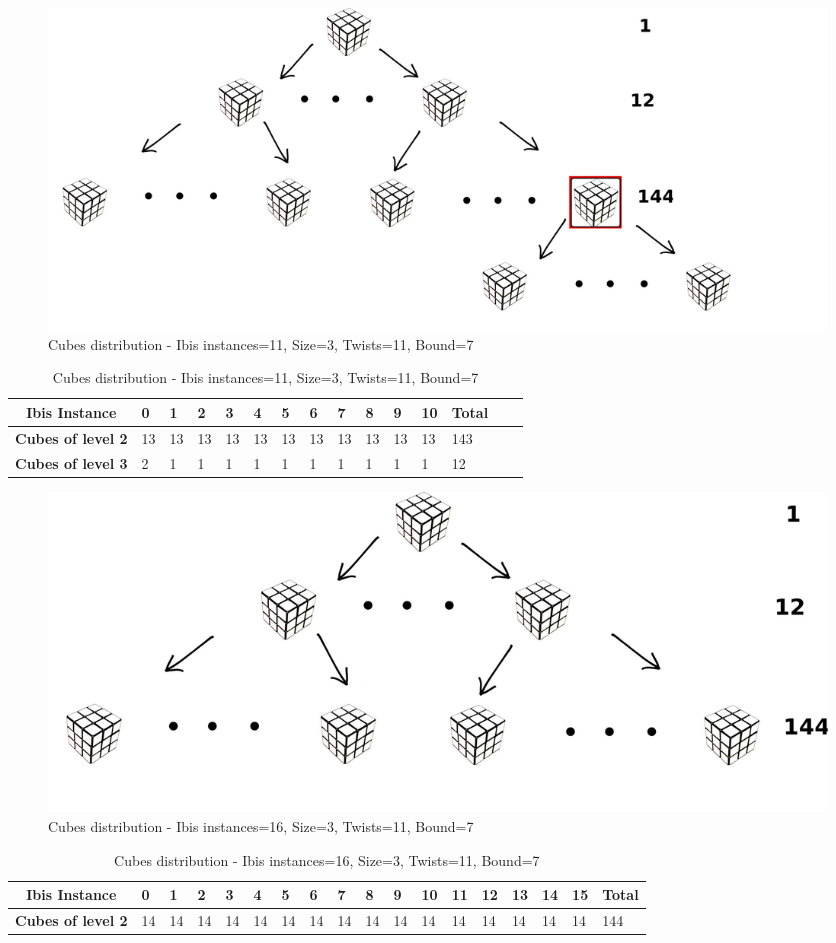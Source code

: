 \documentclass[a4paper]{article}
\begin{document}
\begin{figure}[!ht]
  \centering
  \includegraphics[width=0.7\linewidth]{rubik_tree_eval3}
  \caption{Cubes distribution - Ibis instances=11, Size=3, Twists=11, Bound=7}
  \label{fig:ev1}
\end{figure}
\FloatBarrier

\begin{table}[!ht]
\centering
\begin{tabular}{|l|l|l|l|l|l|l|l|l|l|l|l|l|l|l|}
\multicolumn{1}{|c||}{\bfseries Ibis Instance} & 0 & 1 & 2 & 3 & 4 & 5 & 6 & 7 & 8 & 9 & 10 & \multicolumn{1}{|c|}{\bfseries Total} \\ \hline
\multicolumn{1}{|c||}{\bfseries Cubes of level 2} & 13 & 13 & 13 & 13 & 13 & 13 & 13 & 13 & 13 & 13 & 13 & 143 \\ \hline
\multicolumn{1}{|c||}{\bfseries Cubes of level 3} & 2 & 1 & 1 & 1 & 1 & 1 & 1 & 1 & 1 & 1 & 1 & 12
\end{tabular}
\caption{Cubes distribution - Ibis instances=11, Size=3, Twists=11, Bound=7}
\label{table:tev1}
\end{table}
\FloatBarrier

\begin{figure}[!ht]
  \centering
  \includegraphics[width=0.7\linewidth]{rubik_tree_eval5}
  \caption{Cubes distribution - Ibis instances=16, Size=3, Twists=11, Bound=7}
  \label{fig:ev2}
\end{figure}
\FloatBarrier

\begin{table}[!ht]
\centering
\begin{tabular}{|l|l|l|l|l|l|l|l|l|l|l|l|l|l|l|l|l|l|}
\multicolumn{1}{|c||}{\bfseries Ibis Instance} & 0 & 1 & 2 & 3 & 4 & 5 & 6 & 7 & 8 & 9 & 10 & 11 & 12 & 13 & 14 & 15 & \multicolumn{1}{|c|}{\bfseries Total} \\ \hline
\multicolumn{1}{|c||}{\bfseries Cubes of level 2} & 14 & 14 & 14 & 14 & 14 & 14 & 14 & 14 & 14 & 14 & 14 & 14 & 14 & 14 & 14 & 14 & 144 
\end{tabular}
\caption{Cubes distribution - Ibis instances=16, Size=3, Twists=11, Bound=7}
\label{table:tev2}
\end{table}
\FloatBarrier
\end{document}
